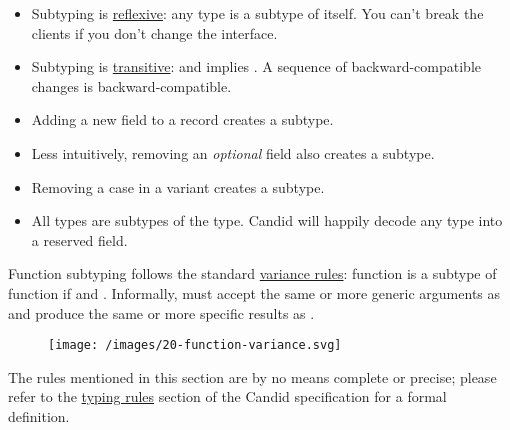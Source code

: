 \documentclass{article}
\begin{document}
\begin{itemize}
    \item
    Subtyping is \href{https://en.wikipedia.org/wiki/Reflexive_relation}{reflexive}: any type is a subtype of itself.
    You can't break the clients if you don't change the interface.
    \item
    Subtyping is \href{https://en.wikipedia.org/wiki/Transitive_relation}{transitive}:  and  implies .
    A sequence of backward-compatible changes is backward-compatible.
    \item
    Adding a new field to a record creates a subtype.\newline
    \item
    Less intuitively, removing an \emph{optional} field also creates a subtype.
    \newline
    \item
    Removing a case in a variant creates a subtype.\newline
    \item
    All types are subtypes of the  type.
    Candid will happily decode any type into a reserved field.
\end{itemize}

Function subtyping follows the standard \href{https://en.wikipedia.org/wiki/Covariance_and_contravariance_(computer_science)#Function_types}{variance rules}:
function  is a subtype of function  if  and .
Informally,  must accept the same or more generic arguments as  and produce the same or more specific results as .

\begin{figure}[grayscale-diagram]
\texttt{[image: /images/20-function-variance.svg]}
\end{figure}

The rules mentioned in this section are by no means complete or precise; please refer to the \href{https://github.com/dfinity/candid/blob/master/spec/Candid.md#rules}{typing rules} section of the Candid specification for a formal definition.
\end{document}
